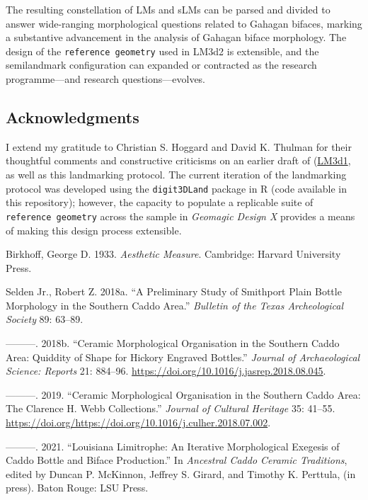 \documentclass[
]{article}
\begin{document}
The resulting constellation of LMs and sLMs can be parsed and divided to
answer wide-ranging morphological questions related to Gahagan bifaces,
marking a substantive advancement in the analysis of Gahagan biface
morphology. The design of the \texttt{reference\ geometry} used in LM3d2
is extensible, and the semilandmark configuration can expanded or
contracted as the research programme---and research questions---evolves.

\hypertarget{acknowledgments}{%
\subsection{Acknowledgments}\label{acknowledgments}}

I extend my gratitude to Christian S. Hoggard and David K. Thulman for
their thoughtful comments and constructive criticisms on an earlier
draft of
(\href{https://github.com/aksel-blaise/gahaganmorph2/blob/master/analysis/landmarking-protocol.md}{LM3d1},
as well as this landmarking protocol. The current iteration of the
landmarking protocol was developed using the \texttt{digit3DLand}
package in R (code available in this repository); however, the capacity
to populate a replicable suite of \texttt{reference\ geometry} across
the sample in \emph{Geomagic Design X} provides a means of making this
design process extensible.

\hypertarget{refs}{}
\leavevmode\hypertarget{ref-RN11786}{}%
Birkhoff, George D. 1933. \emph{Aesthetic Measure}. Cambridge: Harvard
University Press.

\leavevmode\hypertarget{ref-RN11801}{}%
Selden Jr., Robert Z. 2018a. ``A Preliminary Study of Smithport Plain
Bottle Morphology in the Southern Caddo Area.'' \emph{Bulletin of the
Texas Archeological Society} 89: 63--89.

\leavevmode\hypertarget{ref-RN11782}{}%
---------. 2018b. ``Ceramic Morphological Organisation in the Southern
Caddo Area: Quiddity of Shape for Hickory Engraved Bottles.''
\emph{Journal of Archaeological Science: Reports} 21: 884--96.
\url{https://doi.org/10.1016/j.jasrep.2018.08.045}.

\leavevmode\hypertarget{ref-RN11716}{}%
---------. 2019. ``Ceramic Morphological Organisation in the Southern
Caddo Area: The Clarence H. Webb Collections.'' \emph{Journal of
Cultural Heritage} 35: 41--55.
\url{https://doi.org/https://doi.org/10.1016/j.culher.2018.07.002}.

\leavevmode\hypertarget{ref-RN20697}{}%
---------. 2021. ``Louisiana Limitrophe: An Iterative Morphological
Exegesis of Caddo Bottle and Biface Production.'' In \emph{Ancestral
Caddo Ceramic Traditions}, edited by Duncan P. McKinnon, Jeffrey S.
Girard, and Timothy K. Perttula, (in press). Baton Rouge: LSU Press.
\end{document}
